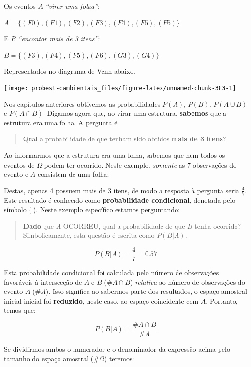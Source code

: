 \documentclass[
]{book}
\begin{document}
Os eventos \(A\) \emph{``virar uma folha''}:

\(A = \{(F0), (F1), (F2), (F3), (F4), (F5), (F6)\}\)

E \(B\) \emph{``encontar mais de 3 itens''}:

\(B = \{(F3), (F4), (F5), (F6), (G3), (G4)\}\)

Representados no diagrama de Venn abaixo.

\begin{center}\texttt{[image: probest-cambientais\_files/figure-latex/unnamed-chunk-383-1]} \end{center}

Nos capítulos anteriores obtivemos as probabilidades \(P(A)\), \(P(B)\), \(P(A \cup B)\) e \(P(A \cap B)\). Digamos agora que, ao virar uma estrutura, \textbf{sabemos} que a estrutura era uma folha. A pergunta é:

\begin{quote}
Qual a probabilidade de que tenham sido obtidos \textbf{mais de 3 itens}?
\end{quote}

Ao informarmos que a estrutura era uma folha, sabemos que nem todos os eventos de \(\Omega\) podem ter ocorrido. Neste exemplo, \emph{somente} as 7 observações do evento e \(A\) consistem de uma folha:

Destas, apenas 4 possuem mais de 3 itens, de modo a resposta à pergunta seria \(\frac{4}{7}\). Este resultado é conhecido como \textbf{probabilidade condicional}, denotada pelo símbolo (\(|\)). Neste exemplo específico estamos perguntando:

\begin{quote}
\textbf{Dado} que \(A\) OCORREU, qual a probabilidade de que \(B\) tenha ocorrido? Simbolicamente, esta questão é escrita como \(P(B|A)\).
\end{quote}

\[P(B|A) = \frac{4}{7} = 0.57\]

Esta probabilidade condicional foi calculada pelo número de observações favoráveis à intersecção de \(A\) e \(B\) (\(\#A \cap B\)) \emph{relativa} ao número de observações do evento \(A\) (\(\#A\)). Isto significa ao sabermos parte dos resultados, o espaço amostral inicial inicial foi \textbf{reduzido}, neste caso, ao espaço coincidente com \(A\). Portanto, temos que:

\[P(B|A) = \frac{\#A \cap B}{\#A}\]

Se dividirmos ambos o numerador e o denominador da expressão acima pelo tamanho do espaço amostral (\(\#\Omega\)) teremos:
\end{document}
